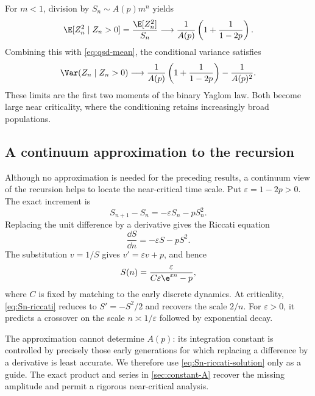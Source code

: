 For \(m<1\), division by \(S_n\sim A(p)m^n\) yields
\begin{equation}
  \E[Z_n^2\mid Z_n>0]
  =\frac{\E[Z_n^2]}{S_n}
  \longrightarrow
  \frac{1}{A(p)}\left(1+\frac{1}{1-2p}\right).
  \label{eq:qsd-second-moment}
\end{equation}
Combining this with \cref{eq:qsd-mean}, the conditional variance satisfies
\begin{equation}
  \Var(Z_n\mid Z_n>0)
  \longrightarrow
  \frac{1}{A(p)}\left(1+\frac{1}{1-2p}\right)
  -\frac{1}{A(p)^2}.
  \label{eq:qsd-variance}
\end{equation}
These limits are the first two moments of the binary Yaglom law.  Both become large
near criticality, where the conditioning retains increasingly broad populations.

\subsection{A continuum approximation to the recursion}
\label{sec:riccati-approximation}

Although no approximation is needed for the preceding results, a continuum view of
the recursion helps to locate the near-critical time scale.  Put
\(\varepsilon=1-2p>0\).  The exact increment is
\begin{equation}
  S_{n+1}-S_n=-\varepsilon S_n-pS_n^2.
  \label{eq:Sn-exact-increment}
\end{equation}
Replacing the unit difference by a derivative gives the Riccati equation
\begin{equation}
  \frac{\dd S}{\dd n}=-\varepsilon S-pS^2.
  \label{eq:Sn-riccati}
\end{equation}
The substitution \(v=1/S\) gives \(v'=\varepsilon v+p\), and hence
\begin{equation}
  S(n)=\frac{\varepsilon}
  {C\varepsilon\e^{\varepsilon n}-p},
  \label{eq:Sn-riccati-solution}
\end{equation}
where \(C\) is fixed by matching to the early discrete dynamics.  At criticality,
\cref{eq:Sn-riccati} reduces to \(S'=-S^2/2\) and recovers the scale \(2/n\).
For \(\varepsilon>0\), it predicts a crossover on the scale
\(n\asymp1/\varepsilon\) followed by exponential decay.

The approximation cannot determine \(A(p)\): its integration constant is controlled
by precisely those early generations for which replacing a difference by a
derivative is least accurate.  We therefore use \cref{eq:Sn-riccati-solution} only
as a guide.  The exact product and series in \cref{sec:constant-A} recover the
missing amplitude and permit a rigorous near-critical analysis.

\FloatBarrier
